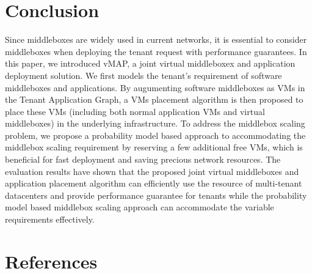 \documentclass[review]{elsarticle}
\begin{document}
\section{Conclusion}\label{sec:final}
Since middleboxes are widely used in current networks, it is essential to consider middleboxes when deploying the tenant request with performance guarantees. %
In this paper, we introduced vMAP, a joint virtual middleboxex and application deployment solution. We first models the tenant's requirement of software middleboxes and applications. By augumenting software middleboxes as VMs in the Tenant Application Graph, a VMs placement algorithm %
is then proposed to place these VMs (including both normal application VMs and virtual middleboxes) in the underlying infrastructure. 
To address the middlebox scaling problem, we propose a probability model based approach to accommodating the middlebox scaling requirement by reserving a few additional free VMs, which is beneficial for fast deployment and saving precious network resources.
The evaluation results have shown that the proposed joint virtual middleboxes and application placement algorithm can efficiently use the resource of multi-tenant datacenters and provide performance guarantee for tenants while the probability model based middlebox scaling approach can accommodate the variable requirements effectively.   

 






%

\section*{References}



\newpage
\end{document}
